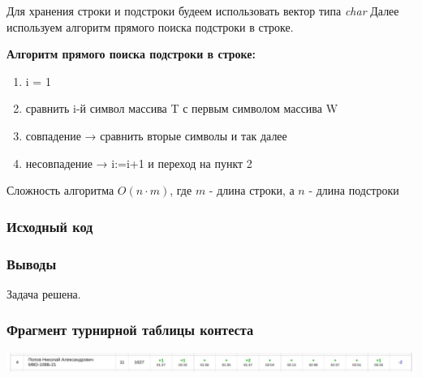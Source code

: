 Для хранения строки и подстроки будеем использовать вектор типа \textit{char}
Далее используем алгоритм прямого поиска подстроки в строке.

\newline

\textbf{Алгоритм прямого поиска подстроки в строке:} 
\begin{enumerate}
    \item i = 1
    \item сравнить i-й символ массива T с первым символом массива W
    \item совпадение → сравнить вторые символы и так далее
    \item несовпадение → i:=i+1 и переход на пункт 2
\end{enumerate}

Сложность алгоритма $O(n \cdot m)$, где $m$ - длина строки, а $n$ - длина подстроки

\subsubsection*{Исходный код}



\subsubsection*{Выводы}
Задача решена.


\subsubsection*{Фрагмент турнирной таблицы контеста}
\begin{center}
\includegraphics[width=\textwidth]{standings/Contest1Result.png}\newline\noindent
\end{center}


\vspace{16pt}

\pagebreak
